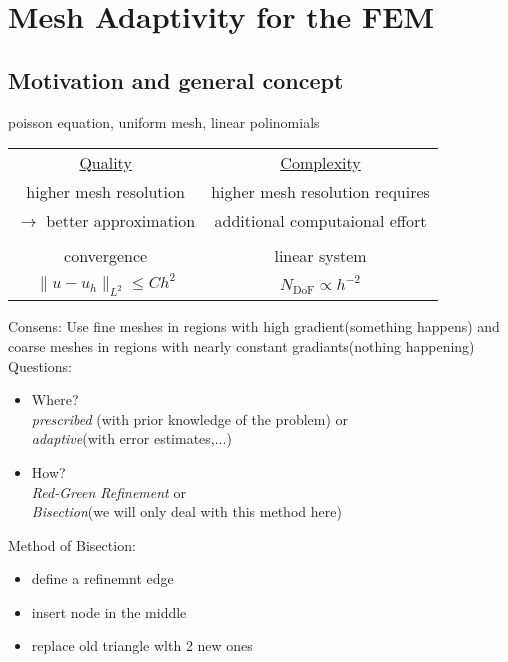 \section{Mesh Adaptivity for the FEM}
\subsection{Motivation and general concept}

\begin{example}
	poisson equation, uniform mesh, linear polinomials
\end{example}
\begin{center}
	\begin{tabular}{c | c}
		\underline{Quality} & \underline{Complexity}\\
		higher mesh resolution & higher mesh resolution requires \\
		$\to$ better approximation & additional computaional effort\\
		&  \\
		convergence & linear system \\
		$\|u-u_h\|_{L^2} \leq C h^2$ & $N_{\text{DoF}}\propto h^{-2}$
	\end{tabular}
\end{center}

Consens: Use fine meshes in regions with high gradient(something happens) and coarse meshes in regions with nearly constant gradiants(nothing happening)\nl
Questions:
\begin{itemize}
	\item Where?\\
		\textit{prescribed} (with prior knowledge of the problem) or \\
		\textit{adaptive}(with error estimates,...)
	\item How?\\
		\textit{Red-Green Refinement} or \\
		\textit{Bisection}(we will only deal with this method here)
\end{itemize}

Method of Bisection:
\begin{itemize}
	\item define a refinemnt edge
	\item insert node in the middle
	\item replace old triangle wlth 2 new ones 
\end{itemize}


